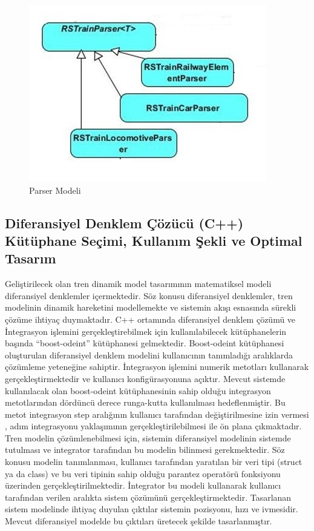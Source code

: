 \documentclass[10pt,a4paper]{article}
\begin{document}
\begin{figure}[h]
\shorthandoff{=}
\centering
\caption{Parser Modeli}
\label{image:parser}
\includegraphics[scale=0.8]{resimler/parser.jpg} 
\end{figure}

\subsection{Diferansiyel Denklem Çözücü (C++) Kütüphane Seçimi, Kullanım Şekli ve Optimal Tasarım}
Geliştirilecek olan tren dinamik model tasarımının matematiksel modeli diferansiyel denklemler içermektedir. Söz konusu diferansiyel denklemler, tren modelinin dinamik hareketini modellemekte ve sistemin akışı esnasında sürekli çözüme ihtiyaç duymaktadır. 
C++ ortamında diferansiyel denklem çözümü ve İntegrasyon işlemini gerçekleştirebilmek için kullanılabilecek kütüphanelerin başında “boost-odeint” kütüphanesi gelmektedir.  Boost-odeint kütüphanesi oluşturulan diferansiyel denklem modelini kullanıcının tanımladığı aralıklarda çözümleme yeteneğine sahiptir. İntegrasyon işlemini numerik metotları kullanarak gerçekleştirmektedir ve kullanıcı konfigürasyonuna açıktır.
Mevcut sistemde kullanılacak olan boost-odeint kütüphanesinin sahip olduğu integrasyon metotlarından dördüncü derece runga-kutta kullanılması hedeflenmiştir. Bu metot integrasyon step aralığının kullanıcı tarafından değiştirilmesine izin vermesi , adım integrasyonu yaklaşımının gerçekleştirilebilmesi ile ön plana çıkmaktadır.
Tren  modelin çözümlenebilmesi için, sistemin diferansiyel modelinin sistemde tutulması ve integrator tarafından bu modelin bilinmesi gerekmektedir. Söz konusu modelin tanımlanması, kullanıcı tarafından yaratılan bir veri tipi (struct ya da class) ve bu veri tipinin sahip olduğu parantez operatörü fonksiyonu üzerinden gerçekleştirilmektedir. İntegrator bu modeli kullanarak kullanıcı tarafından verilen aralıkta sistem çözümünü gerçekleştirmektedir. Tasarlanan sistem modelinde ihtiyaç duyulan çıktılar sistemin pozisyonu, hızı ve ivmesidir. Mevcut diferansiyel modelde bu çıktıları üretecek şekilde tasarlanmıştır.  
\end{document}
